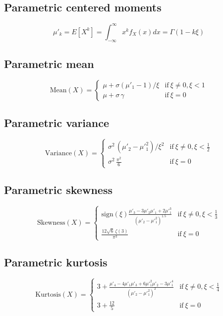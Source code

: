 \documentclass{article}
\begin{document}
\subsection{Parametric centered moments}
\begin{equation*} \mu'_{k}=E[X^k]=\int_{-\infty}^{\infty}x^{k}f_{X}\left(x\right)dx=\Gamma(1-k\xi) \end{equation*}
\subsection{Parametric mean}
\begin{equation*} \mathrm{Mean}(X)=\left\{\begin{array}{cl}\mu+\sigma(\mu'_{1}-1)/\xi & \text{if}\ \xi\neq 0,\xi<1\\ \mu+\sigma\,\gamma & \text{if}\ \xi=0\end{array} \right. \end{equation*}
\subsection{Parametric variance}
\begin{equation*} \mathrm{Variance}(X)=\left\{\begin{array}{cl}\sigma^2\,(\mu'_{2}-\mu'^{2}_{1})/\xi^2 & \text{if}\ \xi\neq0,\xi<\frac12\\ \sigma^2\,\frac{\pi^2}{6} & \text{if}\ \xi=0\end{array} \right. \end{equation*}
\subsection{Parametric skewness}
\begin{equation*} \mathrm{Skewness}(X)=\left\{\begin{array}{cl}\text{sign}(\xi)\frac{\mu'_{3}-3\mu'_{2}\mu'_{1}+2\mu'^{3}_{1}}{(\mu'_{2}-\mu'^{2}_{1})^{1.5}} & \text{if}\ \xi\neq0,\xi<\frac{1}{3} \\ \frac{12 \sqrt{6}\,\zeta(3)}{\pi^3} & \text{if}\ \xi=0\end{array} \right. \end{equation*}
\subsection{Parametric kurtosis}
\begin{equation*} \mathrm{Kurtosis}(X)=\left\{\begin{array}{cl}3+\frac{\mu'_{4}-4\mu'_{1}\mu'_{3}+6\mu'^{2}_{1}\mu'_{2}-3\mu'^{4}_{1}}{(\mu'_{2}-\mu'^{2}_{1})^{2}} & \text{if}\ \xi\neq0,\xi<\frac{1}{4}\\ 3+\frac{12}{5} & \text{if}\ \xi=0\end{array} \right. \end{equation*}
\end{document}
